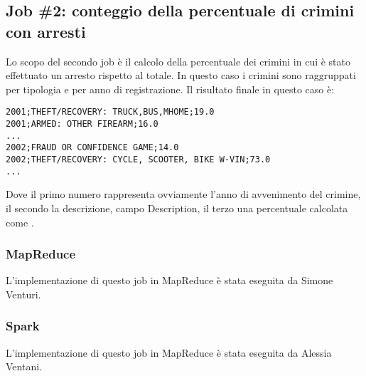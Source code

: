 \documentclass[10pt]{article}
\begin{document}
\subsection{Job \#2: conteggio della percentuale di crimini con arresti}
Lo scopo del secondo job è il calcolo della percentuale dei crimini in cui è stato effettuato un arresto rispetto al totale. In questo caso i crimini sono raggruppati per tipologia e per anno di registrazione.
Il risultato finale in questo caso è:
\begin{lstlisting}
2001;THEFT/RECOVERY: TRUCK,BUS,MHOME;19.0
2001;ARMED: OTHER FIREARM;16.0
...
2002;FRAUD OR CONFIDENCE GAME;14.0
2002;THEFT/RECOVERY: CYCLE, SCOOTER, BIKE W-VIN;73.0
...
\end{lstlisting}
Dove il primo numero rappresenta ovviamente l'anno di avvenimento del crimine, il secondo la descrizione, campo Description, il terzo una percentuale calcolata come
 .


\subsubsection{MapReduce}
L'implementazione di questo job in MapReduce è stata eseguita da Simone Venturi.

\subsubsection{Spark}
L'implementazione di questo job in MapReduce è stata eseguita da Alessia Ventani.
\end{document}
